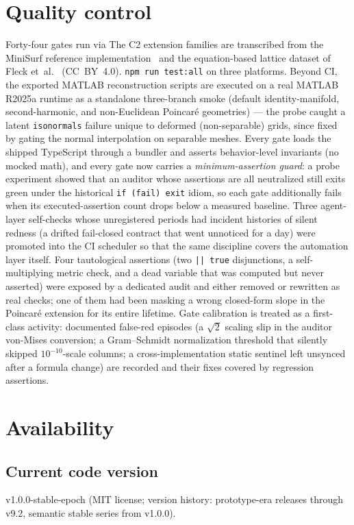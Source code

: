 \documentclass[5p,times,authoryear]{elsarticle}
\begin{document}
\section{Quality control}
Forty-four gates run via
The C2 extension families are transcribed from the MiniSurf reference implementation~\cite{hsieh2020minisurf}
and the equation-based lattice dataset of Fleck et~al.~\cite{fleck2023lattice} (CC~BY~4.0).
\texttt{npm run test:all} on three platforms. Beyond CI, the exported MATLAB reconstruction
scripts are executed on a real MATLAB R2025a runtime as a standalone three-branch smoke
(default identity-manifold, second-harmonic, and non-Euclidean Poincar\'e geometries) --- the
probe caught a latent \texttt{isonormals} failure unique to deformed (non-separable) grids,
since fixed by gating the normal interpolation on separable meshes. Every gate loads the shipped TypeScript through a
bundler and asserts behavior-level invariants (no mocked math), and every gate now carries a
\emph{minimum-assertion guard}: a probe experiment showed that an auditor whose assertions are all
neutralized still exits green under the historical \texttt{if (fail) exit} idiom, so each gate
additionally fails when its executed-assertion count drops below a measured baseline. Three
agent-layer self-checks whose unregistered periods had incident histories of silent redness (a
drifted fail-closed contract that went unnoticed for a day) were promoted into the CI scheduler
so that the same discipline covers the automation layer itself. Four
tautological assertions (two \texttt{|| true} disjunctions, a self-multiplying metric check, and a
dead variable that was computed but never asserted) were exposed by a dedicated audit and either
removed or rewritten as real checks; one of them had been masking a wrong closed-form slope in the
Poincaré extension for its entire lifetime. Gate calibration is treated as a first-class
activity: documented false-red episodes (a $\sqrt2$ scaling slip in the auditor von-Mises
conversion; a Gram--Schmidt normalization threshold that silently skipped $10^{-10}$-scale columns;
a cross-implementation static sentinel left unsynced after a formula change) are recorded and their
fixes covered by regression assertions.

\section{Availability}
\subsection{Current code version}
v1.0.0-stable-epoch (MIT license; version history: prototype-era releases through v9.2, semantic stable series from v1.0.0).
\end{document}
